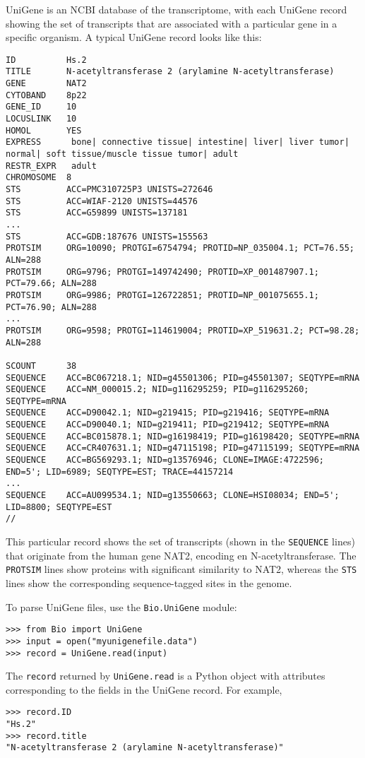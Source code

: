 \documentclass{report}
\begin{document}
UniGene is an NCBI database of the transcriptome, with each UniGene record showing the set of transcripts that are associated with a particular gene in a specific organism. A typical UniGene record looks like this:

\begin{verbatim}
ID          Hs.2
TITLE       N-acetyltransferase 2 (arylamine N-acetyltransferase)
GENE        NAT2
CYTOBAND    8p22
GENE_ID     10
LOCUSLINK   10
HOMOL       YES
EXPRESS      bone| connective tissue| intestine| liver| liver tumor| normal| soft tissue/muscle tissue tumor| adult
RESTR_EXPR   adult
CHROMOSOME  8
STS         ACC=PMC310725P3 UNISTS=272646
STS         ACC=WIAF-2120 UNISTS=44576
STS         ACC=G59899 UNISTS=137181
...
STS         ACC=GDB:187676 UNISTS=155563
PROTSIM     ORG=10090; PROTGI=6754794; PROTID=NP_035004.1; PCT=76.55; ALN=288
PROTSIM     ORG=9796; PROTGI=149742490; PROTID=XP_001487907.1; PCT=79.66; ALN=288
PROTSIM     ORG=9986; PROTGI=126722851; PROTID=NP_001075655.1; PCT=76.90; ALN=288
...
PROTSIM     ORG=9598; PROTGI=114619004; PROTID=XP_519631.2; PCT=98.28; ALN=288

SCOUNT      38
SEQUENCE    ACC=BC067218.1; NID=g45501306; PID=g45501307; SEQTYPE=mRNA
SEQUENCE    ACC=NM_000015.2; NID=g116295259; PID=g116295260; SEQTYPE=mRNA
SEQUENCE    ACC=D90042.1; NID=g219415; PID=g219416; SEQTYPE=mRNA
SEQUENCE    ACC=D90040.1; NID=g219411; PID=g219412; SEQTYPE=mRNA
SEQUENCE    ACC=BC015878.1; NID=g16198419; PID=g16198420; SEQTYPE=mRNA
SEQUENCE    ACC=CR407631.1; NID=g47115198; PID=g47115199; SEQTYPE=mRNA
SEQUENCE    ACC=BG569293.1; NID=g13576946; CLONE=IMAGE:4722596; END=5'; LID=6989; SEQTYPE=EST; TRACE=44157214
...
SEQUENCE    ACC=AU099534.1; NID=g13550663; CLONE=HSI08034; END=5'; LID=8800; SEQTYPE=EST
//
\end{verbatim}

This particular record shows the set of transcripts (shown in the \verb+SEQUENCE+ lines) that originate from the human gene NAT2, encoding en N-acetyltransferase. The \verb+PROTSIM+ lines show proteins with significant similarity to NAT2, whereas the \verb+STS+ lines show the corresponding sequence-tagged sites in the genome.

To parse UniGene files, use the \verb+Bio.UniGene+ module:
\begin{verbatim}
>>> from Bio import UniGene
>>> input = open("myunigenefile.data")
>>> record = UniGene.read(input)
\end{verbatim}

The \verb+record+ returned by \verb+UniGene.read+ is a Python object with attributes corresponding to the fields in the UniGene record. For example,
\begin{verbatim}
>>> record.ID
"Hs.2"
>>> record.title
"N-acetyltransferase 2 (arylamine N-acetyltransferase)"
\end{verbatim}
\end{document}
